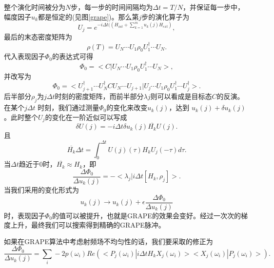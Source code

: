 整个演化时间被分为$N$步，每一步的时间间隔均为$\Delta t = T/N$，并保证每一步中，幅度因子$u_k$都是恒定的(见图\ref{grape})。那么第$j$步的演化算子为
\begin{equation}\label{aaa}
U_j = e^{-i\Delta t ((H_{int} + \sum_{k=1}^mu_k(j)H_{ext})},
\end{equation}
最后的末态密度矩阵为
\begin{equation}\label{aaa}
\rho(T) = U_N\cdots U_1 \rho_0 U_1^{\dagger}\cdots U_N.
\end{equation}
代入表现因子$\Phi_0$的表达式可得
\begin{equation}\label{aaa}
\Phi_0 = <C|U_N\cdots U_1 \rho_0 U_1^{\dagger}\cdots U_N>,
\end{equation}
并改写为
\begin{equation}\label{aaa}
\Phi_0 = <U_{j+1}^{\dagger}\cdots U_N^{\dagger} C U_N\cdots U_{j+1}|U_j\cdots U_1 \rho_0 U_1^{\dagger}\cdots U_j^{\dagger}>.
\end{equation}
后半部分$\rho_j$为$j\Delta t$时刻的密度矩阵，而前半部分$\lambda j$则可以看成是目标态$C$的反演。在某个$j\Delta t$ 时刻，我们通过测量$\Phi_0$的变化来改变$u_k(j)$，达到 $u_k(j)+\delta u_k(j) $。此时整个$U_j$的变化在一阶近似可以写成
\begin{equation}\label{aaa}
\delta U(j) = -i\Delta t \delta u_k(j) \overline{H_k} U(j).
\end{equation}
且
\begin{equation}\label{aaa}
\overline{H_k} \Delta t = \int_0^{\Delta t} U(j)(\tau)H_kU_j(-\tau)d\tau.
\end{equation}
当$\Delta t$趋近于0时，$\overline{H_k} \approx H_k$，即
\begin{equation}\label{aaa}
\frac{\Delta \Phi_0}{\Delta u_k(j)} = -<\lambda_j|i\Delta t[H_k,\rho_j]>.
\end{equation}
当我们采用的变化形式为
\begin{equation}\label{aaa}
u_k(j)\longrightarrow u_k(j) + \epsilon\frac{\Delta \Phi_0}{\Delta u_k(j)}
\end{equation}
时，表现因子$\Phi_0$的值可以被提升，也就是GRAPE的效果会变好。经过一次次的梯度上升，最终我们可以搜索得到精确的GRAPE脉冲。

如果在GRAPE算法中考虑射频场不均匀性的话，我们要采取的修正为
\begin{equation}\label{aaa}
\frac{\Delta \Phi_0}{\Delta u_k(j)} = \sum_i - 2p(\omega_i) Re(<P_j(\omega_i)|i\Delta t H_k X_j(\omega_i)>< X_j(\omega_i)|P_j(\omega_i)>).
\end{equation}

